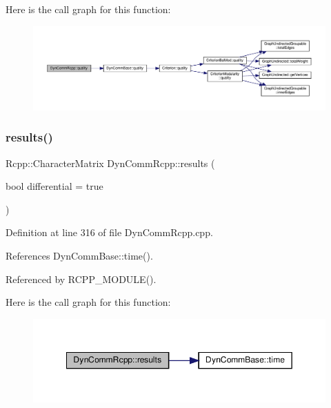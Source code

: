 Here is the call graph for this function\+:
\nopagebreak
\begin{figure}[H]
\begin{center}
\leavevmode
\includegraphics[width=350pt]{classDynCommRcpp_a3d9d6845d9e67941da187bca511cdfcf_cgraph}
\end{center}
\end{figure}
\mbox{\label{classDynCommRcpp_a4120d9f0232611e4ecb497eaf6e4706a}} 
\subsubsection{\texorpdfstring{results()}{results()}}
{\footnotesize\ttfamily Rcpp\+::\+Character\+Matrix Dyn\+Comm\+Rcpp\+::results (\begin{DoxyParamCaption}\item[{bool}]{differential = {\ttfamily true} }\end{DoxyParamCaption})\hspace{0.3cm}{\ttfamily [inline]}}



Definition at line 316 of file Dyn\+Comm\+Rcpp.\+cpp.



References Dyn\+Comm\+Base\+::time().



Referenced by R\+C\+P\+P\+\_\+\+M\+O\+D\+U\+L\+E().

Here is the call graph for this function\+:
\nopagebreak
\begin{figure}[H]
\begin{center}
\leavevmode
\includegraphics[width=349pt]{classDynCommRcpp_a4120d9f0232611e4ecb497eaf6e4706a_cgraph}
\end{center}
\end{figure}
\mbox{\label{classDynCommRcpp_a89773080b66fd210a7e22234ba04a19f}} 
